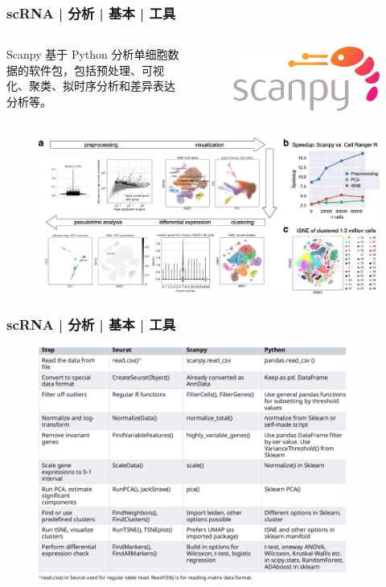 \documentclass[11pt]{ctexbeamer}
\begin{document}
\begin{frame}
	\frametitle{scRNA | 分析 | 基本 | 工具}
	\begin{columns}
	\begin{block}{\alert{Scanpy}}
		基于 \alert{Python} 分析单细胞数据的软件包，包括预处理、可视化、聚类、拟时序分析和差异表达分析等。
	\end{block}
     \begin{figure}
		\includegraphics[width=\textwidth]{scRNA_scanpy_logo.png}
	\end{figure}
\end{columns}
	\begin{figure}
		\includegraphics[width=\textwidth]{scRNA_scanpy.png}
	\end{figure}
\end{frame}

\begin{frame}
  \frametitle{scRNA | 分析 | 基本 | 工具}
  	\begin{figure}
   	\includegraphics[width=0.9\textwidth]{scRNA_tools_01.png}
  \end{figure}
\end{frame}
\end{document}
